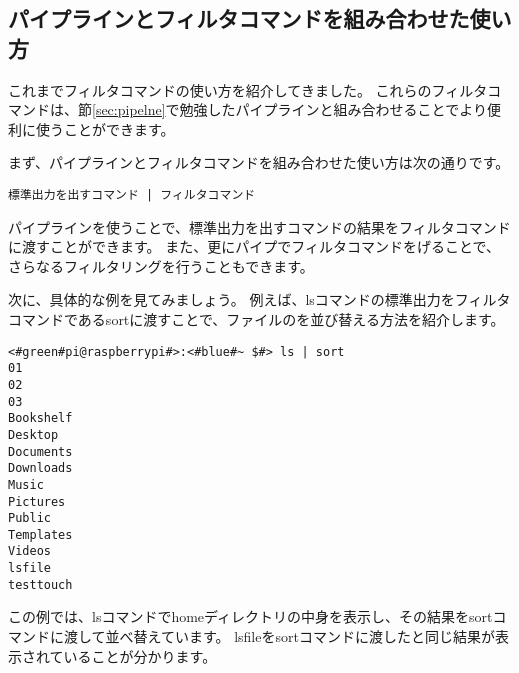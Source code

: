 \subsection{パイプラインとフィルタコマンドを組み合わせた使い方}
これまでフィルタコマンドの使い方を紹介してきました。
これらのフィルタコマンドは、節\ref{sec:pipelne}で勉強したパイプラインと組み合わせることでより便利に使うことができます。

まず、パイプラインとフィルタコマンドを組み合わせた使い方は次の通りです。

\begin{lstlisting}[caption=パイプラインを用いたフィルタコマンドの実行例, label=pipeline_filter]
標準出力を出すコマンド | フィルタコマンド
\end{lstlisting}

パイプラインを使うことで、標準出力を出すコマンドの結果をフィルタコマンドに渡すことができます。
また、更にパイプでフィルタコマンドをげることで、さらなるフィルタリングを行うこともできます。

次に、具体的な例を見てみましょう。
例えば、lsコマンドの標準出力をフィルタコマンドであるsortに渡すことで、ファイルのを並び替える方法を紹介します。

\begin{lstlisting}[caption=パイプラインを用いたsortコマンドの実行例, label=sort_example]
<#green#pi@raspberrypi#>:<#blue#~ $#> ls | sort
01
02
03
Bookshelf
Desktop
Documents
Downloads
Music
Pictures
Public
Templates
Videos
lsfile
testtouch
\end{lstlisting}

この例では、lsコマンドでhomeディレクトリの中身を表示し、その結果をsortコマンドに渡して並べ替えています。
lsfileをsortコマンドに渡したと同じ結果が表示されていることが分かります。


